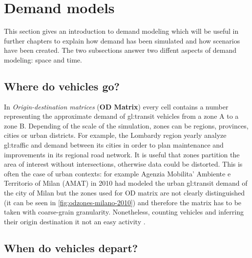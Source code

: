\section{Demand models}

This section gives an introduction to demand modeling which will be useful in further chapters to explain how demand has been simulated and how scenarios have been created.
The two subsections answer two diffent aspects of demand modeling: space and time.

\subsection{Where do vehicles go?}

In \textit{Origin-destination matrices} (\textbf{OD Matrix}) every cell contains a number representing the approximate demand of \gls{gl:transit} vehicles from a zone A to a zone B. Depending of the scale of the simulation, zones can be regions, provinces, cities or urban districts.
For example, the Lombardy region yearly analyze \gls{gl:traffic} and demand \cite{ODLombardia2014} between its cities in order to plan maintenance and improvements in its regional road network.
It is useful that zones partition the area of interest without intersections, otherwise data could be distorted. This is often the case of urban contexts: for example Agenzia Mobilita' Ambiente e Territorio of Milan (AMAT) in 2010 \cite{ODMilano2010} had modeled the urban \gls{gl:transit} demand of the city of Milan but the zones used for OD matrix are not clearly distinguished (it can be seen in \ref{fig:odzones-milano-2010}) and therefore the matrix has to be taken with coarse-grain granularity.
Nonetheless, counting vehicles and inferring their origin destination it not an easy activity \cite{bell1983estimation}.


\subsection{When do vehicles depart?}

